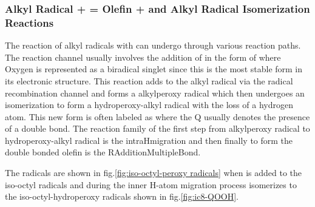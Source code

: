 
\subsubsection{Alkyl Radical +  = Olefin +  and Alkyl Radical Isomerization Reactions}

The reaction of alkyl radicals with  can undergo through various reaction paths. The reaction channel usually involves the addition of  in the form of  where Oxygen is represented as a biradical singlet since this is the most stable form in its electronic structure. This reaction adds to the alkyl radical via the radical recombination channel and forms a alkylperoxy radical which then undergoes an isomerization to form a hydroperoxy-alkyl radical with the loss of a hydrogen atom. This new form is often labeled as  where the Q usually denotes the presence of a double bond. The reaction family of the first step from alkylperoxy radical to hydroperoxy-alkyl radical is the intra\textunderscore H\textunderscore migration and then finally to form the double bonded olefin is the R\textunderscore Addition\textunderscore MultipleBond.


The  radicals are shown in fig.\ref{fig:iso-octyl-peroxy radicals} when  is added to the iso-octyl radicals and during the inner H-atom migration process isomerizes to the iso-octyl-hydroperoxy radicals  shown in fig.\ref{fig:ic8-QOOH}.

